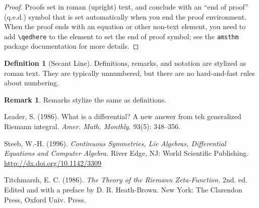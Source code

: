 \documentclass{book}
\theoremstyle{theorem}
\theoremstyle{definition}
\newtheorem*{definition}{Definition}
\newtheorem*{remark}{Remark}
\begin{document}
    \begin{proof}
        Proofs set in roman (upright) text, and conclude with an ``end of proof'' (q.e.d.) symbol that is set automatically when you end the proof environment.  When the proof ends with an equation or other non-text element, you need to add \verb~\qedhere~ to the element to set the end of proof symbol; see the \texttt{amsthm} package documentation for more details.
    \end{proof}

    \begin{definition}[Secant Line]
        Definitions, remarks, and notation are stylized as roman text.  They are typically unnumbered, but there are no hard-and-fast rules about numbering.
    \end{definition}

    \begin{remark}
        Remarks stylize the same as definitions.
    \end{remark}

    \begin{thebibliography}{3}

        Leader, S. (1986). What is a differential? A new answer from teh generalized Riemann integral. {\it Amer. Math. Monthly.\/} 93(5): 348--356.

        Steeb, W.-H. (1996). \textit{Continuous Symmetries, Lie Algebras, Differential Equations and Computer Algebra.\/} River Edge, NJ: World Scientific Publishing.  \href{http://dx.doi.org/10.1142/3309}{\url{http://dx.doi.org/10.1142/3309}}

        Titchmarsh, E. C. (1986). {\it The Theory of the Riemann Zeta-Function.\/} 2nd. ed. Edited and with a preface by D. R. Heath-Brown. New York: The Clarendon Press, Oxford Univ. Press.

    \end{thebibliography}
\end{document}
